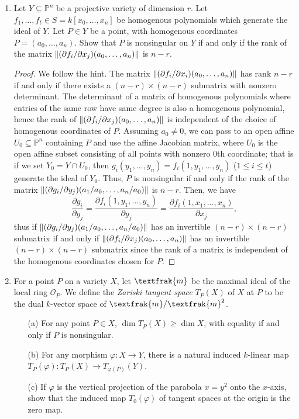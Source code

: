 \documentclass[12pt]{article}
\DeclarePairedDelimiter{\norm}{\lVert}{\rVert}
\newcommand{\goth}[1]{\textfrak{#1}}
\newcommand{\pd}[2]{\frac{\partial #1}{\partial #2}}
\newcommand{\OO}{\mathcal{O}}
\newcommand{\PP}{\mathbb{P}}
\theoremstyle{definition}
\begin{document}
\begin{enumerate} [label=\textbf{\arabic*.}, leftmargin=-0.05em]
\item Let $Y \subseteq \PP^n$ be a projective variety of dimension $r$. Let $f_1, \dots, f_t \in S = k[x_0, \dots, x_n]$ be homogenous polynomials which generate the ideal of $Y$. Let $P \in Y$ be a point, with homogenous coordinates $P = (a_0, \dots, a_n)$. Show that $P$ is nonsingular on $Y$ if and only if the rank of the matrix $\norm{(\partial f_i / \partial x_j)(a_0, \dots, a_n)}$ is $n - r$.

\begin{proof}
    We follow the hint. The matrix $\norm{(\partial f_i / \partial x_i)(a_0, \dots, a_n)}$ has rank $n-r$ if and only if there exists a $(n - r) \times (n - r)$ submatrix with nonzero determinant. The determinant of a matrix of homogenous polynomials where entries of the same row have same degree is also a homogenous polynomial, hence the rank of $\norm{(\partial f_i / \partial x_j)(a_0, \dots, a_n)}$ is independent of the choice of homogenous coordinates of $P$. Assuming $a_0 \neq 0$, we can pass to an open affine $U_0 \subseteq \PP^n$ containing $P$ and use the affine Jacobian matrix, where $U_0$ is the open affine subset consisting of all points with nonzero $0$th coordinate; that is if we set $Y_0 = Y \cap U_0$, then $g_i(y_1, \dots, y_n) = f_i(1, y_1, \dots, y_n)$ ($1 \leq i \leq t$) generate the ideal of $Y_0$. Thus, $P$ is nonsingular if and only if the rank of the matrix $\norm{(\partial g_i / \partial y_j)(a_1 / a_0, \dots, a_n / a_0)}$ is $n - r$. Then, we have
    \begin{equation*}
        \pd{g_i}{y_j} = \pd{f_i(1, y_1, \dots, y_n)}{y_j} = \pd{f_i(1, x_1, \dots, x_n)}{x_j},
    \end{equation*}
    thus if $\norm{(\partial g_i / \partial y_j)(a_1 / a_0, \dots, a_n / a_0)}$ has an invertible $(n - r) \times (n - r)$ submatrix if and only if $\norm{(\partial f_i / \partial x_j)(a_0, \dots, a_n)}$ has an invertible $(n - r) \times (n - r)$ submatrix since the rank of a matrix is independent of the homogenous coordinates chosen for $P$.
\end{proof}

\item For a point $P$ on a variety $X$, let $\goth{m}$ be the maximal ideal of the local ring $\OO_P$. We define the \textit{Zariski tangent space} $T_P(X)$ of $X$ at $P$ to be the dual $k$-vector space of $\goth{m} / \goth{m}^2$.
\begin{itemize}
    \item[(a)] For any point $P \in X$, $\dim{T_P(X)} \geq \dim{X}$, with equality if and only if $P$ is nonsingular.
    \item[(b)] For any morphism $\varphi : X \to Y$, there is a natural induced $k$-linear map $T_P(\varphi) : T_P(X) \to T_{\varphi(P)}(Y)$.
    \item[(c)] If $\varphi$ is the vertical projection of the parabola $x = y^2$ onto the $x$-axis, show that the induced map $T_0(\varphi)$ of tangent spaces at the origin is the zero map.
\end{itemize}


\end{enumerate}
\end{document}
